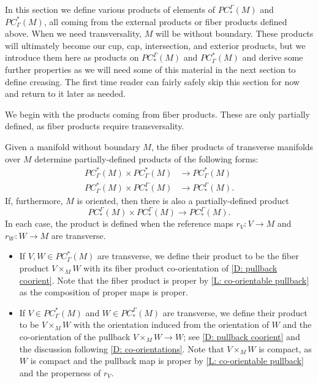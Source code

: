 In this section we define various products of elements of $PC_*^\Gamma(M)$ and $PC^*_\Gamma(M)$, all coming from the external products or fiber products defined above.
When we need transversality, $M$ will be without boundary.
These products will ultimately become our cup, cap, intersection, and exterior products, but we introduce them here as products on $PC_*^\Gamma(M)$ and $PC^*_\Gamma(M)$ and derive some further properties as we will need some of this material in the next section to define creasing.
The first time reader can fairly safely skip this section for now and return to it later as needed.

We begin with the products coming from fiber products.
These are only partially defined, as fiber products require transversality.

\begin{definition}\label{D: PC products}
	Given a manifold without boundary $M$, the fiber products of transverse manifolds over $M$ determine partially-defined products of the following forms:
	\begin{align*}
		PC^*_\Gamma(M) \times PC^*_\Gamma(M)& \to PC^*_\Gamma(M)\\
		PC^*_\Gamma(M) \times PC_*^\Gamma(M)& \to PC_*^\Gamma(M).
	\end{align*}
	If, furthermore, $M$ is oriented, then there is also a partially-defined product
	$$PC_*^\Gamma(M) \times PC_*^\Gamma(M) \to PC_*^\Gamma(M).$$
	In each case, the product is defined when the reference maps $r_V \colon V \to M$ and $r_W \colon W \to M$ are transverse.

		\begin{itemize}
			\item If $V,W\in PC^*_\Gamma(M)$ are transverse, we define their product to be the fiber product $V \times_M W$ with its fiber product co-orientation of \cref{D: pullback coorient}. Note that the fiber product is proper by \cref{L: co-orientable pullback} as the composition of proper maps is proper.

			\item If $V \in PC^*_\Gamma(M)$ and $W \in PC_*^\Gamma(M)$ are transverse, we define their product to be $V \times_M W$ with the orientation induced from the orientation of $W$ and the co-orientation of the pullback $V \times_M W \to W$; see \cref{D: pullback coorient} and the discussion following \cref{D: co-orientations}.
			Note that $V \times_M W$ is compact, as $W$ is compact and the pullback map is proper by \cref{L: co-orientable pullback} and the properness of $r_V$.


\end{itemize}
\end{definition}
